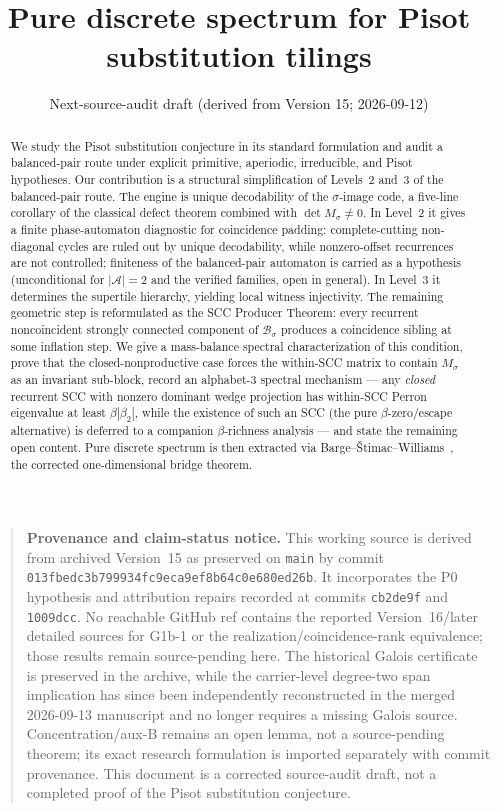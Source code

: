 \documentclass[11pt]{article}
\title{Pure discrete spectrum for Pisot substitution tilings}
\author{}
\date{Next-source-audit draft (derived from Version 15; 2026-09-12)}
\theoremstyle{plain}
\theoremstyle{definition}
\theoremstyle{remark}
\newcommand{\A}{\mathcal{A}}
\newcommand{\B}{\mathcal{B}}
\begin{document}
\maketitle

\begin{quote}\small
\textbf{Provenance and claim-status notice.} This working source is derived from archived Version~15 as preserved on \texttt{main} by commit \texttt{013fbedc3b799934fc9eca9ef8b64c0e680ed26b}. It incorporates the P0 hypothesis and attribution repairs recorded at commits \texttt{cb2de9f} and \texttt{1009dcc}. No reachable GitHub ref contains the reported Version~16/later detailed sources for G1b-1 or the realization/coincidence-rank equivalence; those results remain source-pending here. The historical Galois certificate is preserved in the archive, while the carrier-level degree-two span implication has since been independently reconstructed in the merged 2026-09-13 manuscript and no longer requires a missing Galois source. Concentration/aux-B remains an open lemma, not a source-pending theorem; its exact research formulation is imported separately with commit provenance. This document is a corrected source-audit draft, not a completed proof of the Pisot substitution conjecture.
\end{quote}

\begin{abstract}
We study the Pisot substitution conjecture in its standard formulation and audit a balanced-pair route under explicit primitive, aperiodic, irreducible, and Pisot hypotheses. Our contribution is a structural simplification of Levels~2 and~3 of the balanced-pair route. The engine is unique decodability of the $\sigma$-image code, a five-line corollary of the classical defect theorem combined with $\det M_\sigma\ne 0$. In Level~2 it gives a finite phase-automaton diagnostic for coincidence padding: complete-cutting non-diagonal cycles are ruled out by unique decodability, while nonzero-offset recurrences are not controlled; finiteness of the balanced-pair automaton is carried as a hypothesis (unconditional for $|\A|=2$ and the verified families, open in general). In Level~3 it determines the supertile hierarchy, yielding local witness injectivity. The remaining geometric step is reformulated as the SCC Producer Theorem: every recurrent noncoincident strongly connected component of $\B_\sigma$ produces a coincidence sibling at some inflation step. We give a mass-balance spectral characterization of this condition, prove that the closed-nonproductive case forces the within-SCC matrix to contain $M_\sigma$ as an invariant sub-block, record an alphabet-3 spectral mechanism --- any \emph{closed} recurrent SCC with nonzero dominant wedge projection has within-SCC Perron eigenvalue at least $\beta|\beta_2|$, while the existence of such an SCC (the pure $\beta$-zero/escape alternative) is deferred to a companion $\beta$-richness analysis --- and state the remaining open content. Pure discrete spectrum is then extracted via Barge--\v{S}timac--Williams~\cite{BSW}, the corrected one-dimensional bridge theorem.
\end{abstract}
\end{document}
